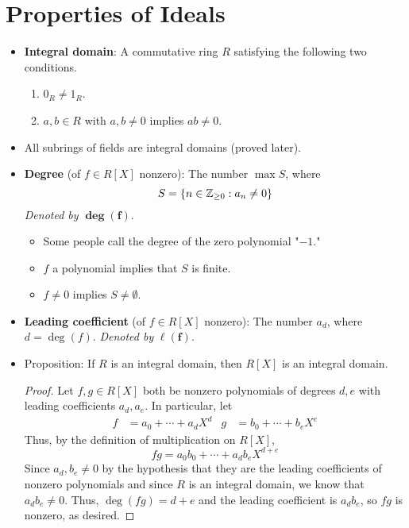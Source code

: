 \documentclass[../notes.tex]{subfiles}
\begin{document}
\section{Properties of Ideals}
\begin{itemize}
    \item {}\textbf{Integral domain}: A commutative ring $R$ satisfying the following two conditions.
    \begin{enumerate}[label={(\alph*)}]
        \item $0_R\neq 1_R$.
        \item $a,b\in R$ with $a,b\neq 0$ implies $ab\neq 0$.
    \end{enumerate}
    \item All subrings of fields are integral domains (proved later).
    \item \textbf{Degree} (of $f\in R[X]$ nonzero): The number $\max S$, where
    \begin{equation*}
        S = \{n\in{\mathbb{Z}_{\geq 0}}:a_n\neq 0\}
    \end{equation*}
    \emph{Denoted by} $\bm{\deg(f)}$.
    \begin{itemize}
        \item Some people call the degree of the zero polynomial "$-1$."
        \item $f$ a polynomial implies that $S$ is finite.
        \item $f\neq 0$ implies $S\neq\emptyset$.
    \end{itemize}
    \item \textbf{Leading coefficient} (of $f\in R[X]$ nonzero): The number $a_d$, where $d=\deg(f)$. \emph{Denoted by} $\bm{\ell(f)}$.
    \item Proposition: If $R$ is an integral domain, then $R[X]$ is an integral domain.
    \begin{proof}
        Let $f,g\in R[X]$ both be nonzero polynomials of degrees $d,e$ with leading coefficients $a_d,a_e$. In particular, let
        \begin{align*}
            f &= a_0+\cdots+a_dX^d&
            g &= b_0+\cdots+b_eX^e
        \end{align*}
        Thus, by the definition of multiplication on $R[X]$,
        \begin{equation*}
            fg = a_0b_0+\cdots+a_db_eX^{d+e}
        \end{equation*}
        Since $a_d,b_e\neq 0$ by the hypothesis that they are the leading coefficients of nonzero polynomials and since $R$ is an integral domain, we know that $a_db_e\neq 0$. Thus, $\deg(fg)=d+e$ and the leading coefficient is $a_db_e$, so $fg$ is nonzero, as desired.

\end{proof}
\end{itemize}
\end{document}
